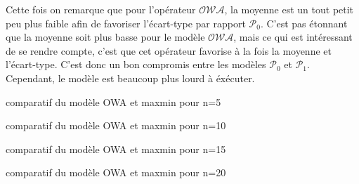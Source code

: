 \documentclass[a4paper, titlepage, oneside, 12pt]{article}%
\begin{document}
Cette fois on remarque que pour l'opérateur $\mathcal{OWA}$, la moyenne est un tout petit peu plus faible afin de favoriser l'écart-type par rapport $\mathcal{P}_0$. C'est pas étonnant que la moyenne soit plus basse pour le modèle $\mathcal{OWA}$, mais ce qui est intéressant de se rendre compte, c'est que cet opérateur favorise à la fois la moyenne et l'écart-type. C'est donc un bon compromis entre les modèles $\mathcal{P}_0$ et $\mathcal{P}_1$. Cependant, le modèle est beaucoup plus lourd à éxécuter.
\begin{table}
\centerline{
}
\caption{comparatif du modèle OWA et maxmin pour n=5  }
\centerline{
}
\caption{comparatif du modèle OWA et maxmin pour n=10 }
\centerline{
}
\caption{comparatif du modèle OWA et maxmin pour n=15 }
\centerline{
}
\caption{comparatif du modèle OWA et maxmin pour n=20 }

\label{question16_bis}
\end{table}
\end{document}

